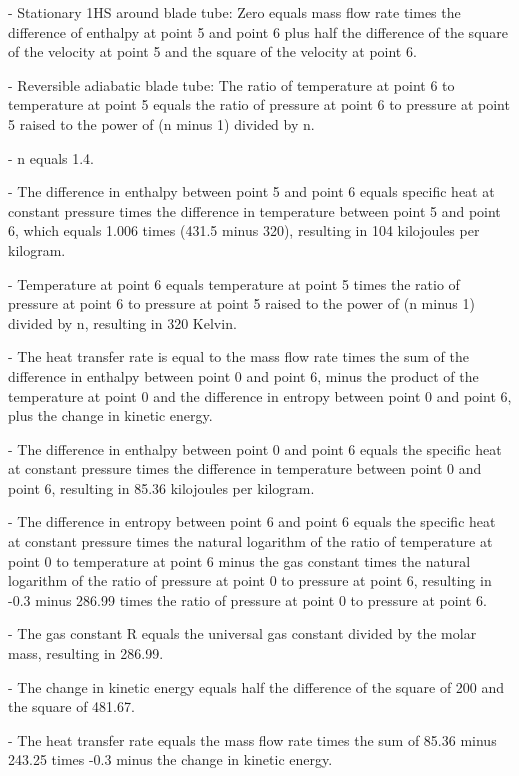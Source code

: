 - Stationary 1HS around blade tube:
  Zero equals mass flow rate times the difference of enthalpy at point 5 and point 6 plus half the difference of the square of the velocity at point 5 and the square of the velocity at point 6.

- Reversible adiabatic blade tube:
  The ratio of temperature at point 6 to temperature at point 5 equals the ratio of pressure at point 6 to pressure at point 5 raised to the power of (n minus 1) divided by n.

- n equals 1.4.

- The difference in enthalpy between point 5 and point 6 equals specific heat at constant pressure times the difference in temperature between point 5 and point 6, which equals 1.006 times (431.5 minus 320), resulting in 104 kilojoules per kilogram.

- Temperature at point 6 equals temperature at point 5 times the ratio of pressure at point 6 to pressure at point 5 raised to the power of (n minus 1) divided by n, resulting in 320 Kelvin.

- The heat transfer rate is equal to the mass flow rate times the sum of the difference in enthalpy between point 0 and point 6, minus the product of the temperature at point 0 and the difference in entropy between point 0 and point 6, plus the change in kinetic energy.

- The difference in enthalpy between point 0 and point 6 equals the specific heat at constant pressure times the difference in temperature between point 0 and point 6, resulting in 85.36 kilojoules per kilogram.

- The difference in entropy between point 6 and point 6 equals the specific heat at constant pressure times the natural logarithm of the ratio of temperature at point 0 to temperature at point 6 minus the gas constant times the natural logarithm of the ratio of pressure at point 0 to pressure at point 6, resulting in -0.3 minus 286.99 times the ratio of pressure at point 0 to pressure at point 6.

- The gas constant R equals the universal gas constant divided by the molar mass, resulting in 286.99.

- The change in kinetic energy equals half the difference of the square of 200 and the square of 481.67.

- The heat transfer rate equals the mass flow rate times the sum of 85.36 minus 243.25 times -0.3 minus the change in kinetic energy.